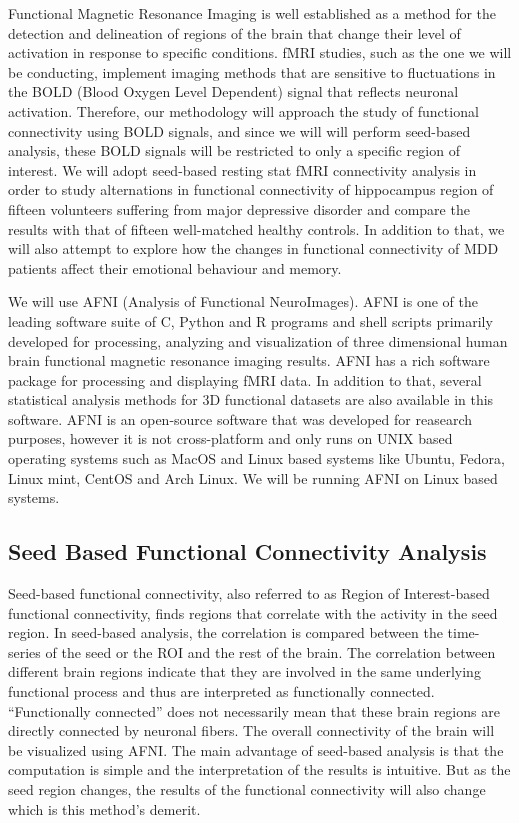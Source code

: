 \documentclass[12pt]{article}
\begin{document}
Functional Magnetic Resonance Imaging is well established as a method
for the detection and delineation of regions of the brain that change
their level of activation in response to specific conditions. fMRI
studies, such as the one we will be conducting, implement imaging
methods that are sensitive to fluctuations in the BOLD (Blood Oxygen
Level Dependent) signal that reflects neuronal activation.  Therefore,
our methodology will approach the study of functional connectivity
using BOLD signals, and since we will will perform seed-based
analysis, these BOLD signals will be restricted to only a specific
region of interest. We will adopt seed-based resting stat fMRI
connectivity analysis in order to study alternations in functional
connectivity of hippocampus region of fifteen volunteers suffering
from major depressive disorder and compare the results with that of
fifteen well-matched healthy controls. In addition to that, we will
also attempt to explore how the changes in functional connectivity of
MDD patients affect their emotional behaviour and memory.

We will use AFNI (Analysis of Functional NeuroImages). AFNI is one of
the leading software suite of C, Python and R programs and shell
scripts primarily developed for processing, analyzing and
visualization of three dimensional human brain functional magnetic
resonance imaging results. AFNI has a rich software package for
processing and displaying fMRI data. In addition to that, several
statistical analysis methods for 3D functional datasets are also
available in this software. AFNI is an open-source software that was
developed for reasearch purposes, however it is not cross-platform and
only runs on UNIX based operating systems such as MacOS and Linux
based systems like Ubuntu, Fedora, Linux mint, CentOS and Arch
Linux. We will be running AFNI on Linux based systems.

\subsection{Seed Based Functional Connectivity Analysis}

Seed-based functional connectivity, also referred to as Region of
Interest-based functional connectivity, finds regions that correlate
with the activity in the seed region. In seed-based analysis, the
correlation is compared between the time-series of the seed or the ROI
and the rest of the brain. The correlation between different brain
regions indicate that they are involved in the same underlying
functional process and thus are interpreted as functionally
connected. ``Functionally connected'' does not necessarily mean that
these brain regions are directly connected by neuronal fibers. The
overall connectivity of the brain will be visualized using AFNI. The
main advantage of seed-based analysis is that the computation is
simple and the interpretation of the results is intuitive. But as the
seed region changes, the results of the functional connectivity will
also change which is this method's demerit.
\end{document}
